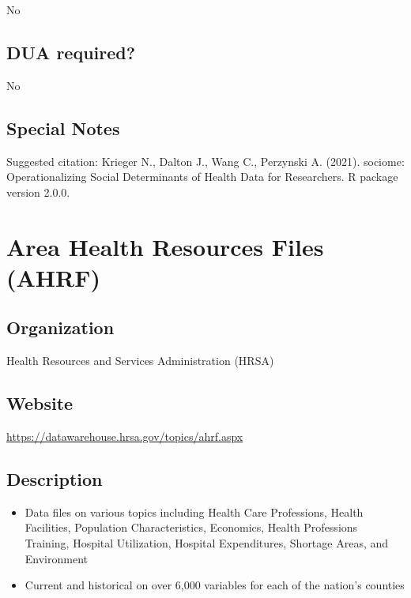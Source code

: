 \documentclass[
]{book}
\providecommand{\tightlist}{%
  \setlength{\itemsep}{0pt}\setlength{\parskip}{0pt}}
\begin{document}
No

\hypertarget{dua-required-9}{%
\section{DUA required?}\label{dua-required-9}}

No

\hypertarget{special-notes-9}{%
\section{Special Notes}\label{special-notes-9}}

Suggested citation: Krieger N., Dalton J., Wang C., Perzynski A. (2021). sociome: Operationalizing Social Determinants of Health Data for Researchers. R package version 2.0.0.

\mainmatter

\hypertarget{area-health-resources-files-ahrf}{%
\chapter{Area Health Resources Files (AHRF)}\label{area-health-resources-files-ahrf}}

\hypertarget{organization-10}{%
\section{Organization}\label{organization-10}}

Health Resources and Services Administration (HRSA)

\hypertarget{website-10}{%
\section{Website}\label{website-10}}

\url{https://datawarehouse.hrsa.gov/topics/ahrf.aspx}

\hypertarget{description-10}{%
\section{Description}\label{description-10}}

\begin{itemize}
\tightlist
\item
  Data files on various topics including Health Care Professions, Health Facilities, Population Characteristics, Economics, Health Professions Training, Hospital Utilization, Hospital Expenditures, Shortage Areas, and Environment
\item
  Current and historical on over 6,000 variables for each of the nation's counties
\end{itemize}
\end{document}
